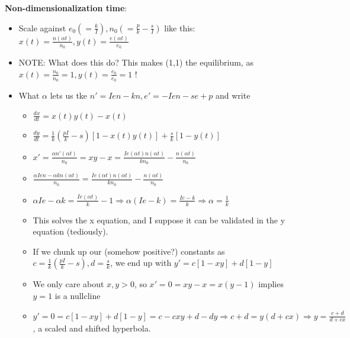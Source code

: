\documentclass[11pt, oneside]{article}   	%
\begin{document}
\textbf{Non-dimensionalization time}:
\begin{itemize}
\item Scale against $e_0 (= \frac{k}{I}), n_0  (= \frac{p}{k} - \frac{s}{I})$ like this: $x(t) = \frac{n(\alpha t)}{n_0}, y(t) = \frac{e(\alpha t)}{e_0}$
\item NOTE: What does this do?  This makes (1,1) the equilibrium, as $x(t) = \frac{n_0}{n_0} = 1, y(t) = \frac{e_0}{e_0} = 1$ !
\item What $\alpha$ lets us tke $n' = Ien - kn, e'=-Ien - se + p$ and write 
\begin{itemize}
\item $\frac{dx}{dt} = x(t)y(t) - x(t)$
\item $\frac{dy}{dt} = \frac{1}{k}(\frac{pI}{k} -s)[1 - x(t)y(t)] + \frac{s}{k}[1-y(t)]$
\item $x' = \frac{\alpha n'(\alpha t)}{n_0} = xy - x = \frac{Ie(\alpha t)n(\alpha t)}{k n_0} - \frac{n(\alpha t)}{n_0}$
\item $\frac{\alpha Ien - \alpha kn(\alpha t)}{n_0} = \frac{Ie(\alpha t)n(\alpha t)}{k n_0} - \frac{n(\alpha t)}{n_0}$
\item $ \alpha Ie - \alpha k = \frac{Ie(\alpha t)}{k} - 1 \Rightarrow \alpha (Ie - k) = \frac{Ie-k}{k} \Rightarrow \alpha = \frac{1}{k}$
\item This solves the x equation, and I suppose it can be validated in the y equation (tediously).
\item If we chunk up our (somehow positive?) constants as $c = \frac{1}{k}(\frac{pI}{k} - s), d = \frac{s}{k}$, we end up with $y' = c[1-xy] + d[1-y]$
\item We only care about $x,y > 0$, so $x' = 0 = xy-x = x(y-1)$ implies $y=1$ is a nullcline
\item $y'  = 0 = c[1-xy] + d[1-y] = c - cxy + d - dy \Rightarrow c+d = y(d + cx) \Rightarrow y = \frac{c+d}{d + cx}$, a scaled and shifted hyperbola.
\end{itemize}


\end{itemize}
\end{document}
